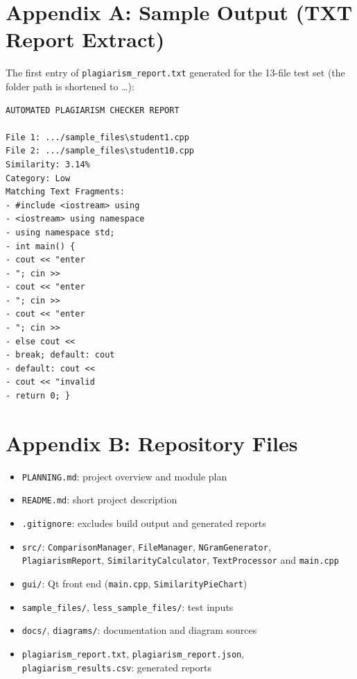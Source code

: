 \documentclass[11pt,a4paper]{report}
\newcommand{\cc}[1]{\texttt{#1}}
\begin{document}
\section*{Appendix A: Sample Output (TXT Report Extract)}
The first entry of \cc{plagiarism\_report.txt} generated for the 13-file test set (the
folder path is shortened to \dots):

\begin{lstlisting}[language={}, basicstyle=\ttfamily\footnotesize,
  caption={First entry of \texttt{plagiarism\_report.txt}.}]
AUTOMATED PLAGIARISM CHECKER REPORT

File 1: .../sample_files\student1.cpp
File 2: .../sample_files\student10.cpp
Similarity: 3.14%
Category: Low
Matching Text Fragments:
- #include <iostream> using
- <iostream> using namespace
- using namespace std;
- int main() {
- cout << "enter
- "; cin >>
- cout << "enter
- "; cin >>
- cout << "enter
- "; cin >>
- else cout <<
- break; default: cout
- default: cout <<
- cout << "invalid
- return 0; }
\end{lstlisting}

\section*{Appendix B: Repository Files}
\begin{itemize}[nosep]
  \item \cc{PLANNING.md}: project overview and module plan
  \item \cc{README.md}: short project description
  \item \cc{.gitignore}: excludes build output and generated reports
  \item \cc{src/}: \cc{ComparisonManager}, \cc{FileManager}, \cc{NGramGenerator},
        \cc{PlagiarismReport}, \cc{SimilarityCalculator}, \cc{TextProcessor} and
        \cc{main.cpp}
  \item \cc{gui/}: Qt front end (\cc{main.cpp}, \cc{SimilarityPieChart})
  \item \cc{sample\_files/}, \cc{less\_sample\_files/}: test inputs
  \item \cc{docs/}, \cc{diagrams/}: documentation and diagram sources
  \item \cc{plagiarism\_report.txt}, \cc{plagiarism\_report.json},
        \cc{plagiarism\_results.csv}: generated reports
\end{itemize}
\end{document}
